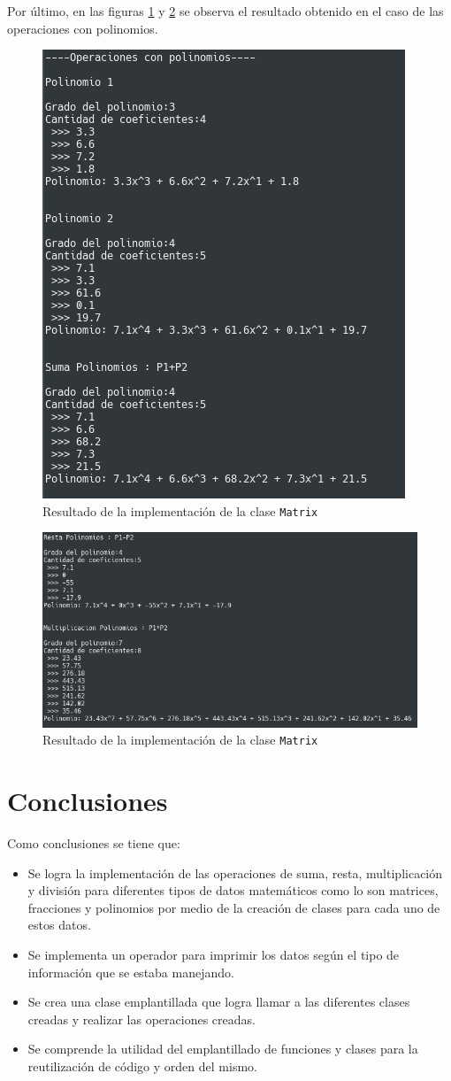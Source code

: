 Por último, en las figuras \ref{fig:res3} y \ref{fig:res4} se observa el resultado obtenido en el caso de las operaciones con polinomios.
\begin{figure}[H]
\centering
\includegraphics[width=.4\textwidth]{imgs/Labo4/result3}
\caption{Resultado de la implementación de la clase \texttt{Matrix}}
\label{fig:res3}
\end{figure}


\begin{figure}[H]
\centering
\includegraphics[width=.4\textwidth]{imgs/Labo4/result4}
\caption{Resultado de la implementación de la clase \texttt{Matrix}}
\label{fig:res4}
\end{figure}


\section{Conclusiones}


Como conclusiones se tiene que:

\begin{itemize}
\item Se logra la implementación de las operaciones de suma, resta, multiplicación y división para diferentes tipos de datos matemáticos como lo son matrices, fracciones y polinomios por medio de la creación de clases para cada uno de estos datos.
\item Se implementa un operador para imprimir los datos según el tipo de información que se estaba manejando.
\item Se crea una clase emplantillada que logra llamar a las diferentes clases creadas y realizar las operaciones creadas.
\item Se comprende la utilidad del emplantillado de funciones y clases para la reutilización de código y orden del mismo.
\end{itemize}


